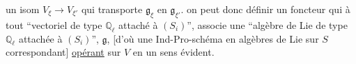 un isom $V_\xi\longrightarrow V_{\xi'}$ qui transporte $\mathfrak g_\xi$ en $\mathfrak g_{\xi'}$.  on peut donc définir \unsure{---} un foncteur  qui à tout ``vectoriel de type $\mathbb Q_\ell$ attaché à $(S_i)$'',  associe une ``algèbre de Lie de type $\mathbb Q_\ell$ attachée à $(S_i)$'',  $\mathfrak g$,  [d'où une Ind-Pro-schéma en algèbres de Lie sur $S$ correspondant] \uline{opérant} sur $V$ en un sens évident.
